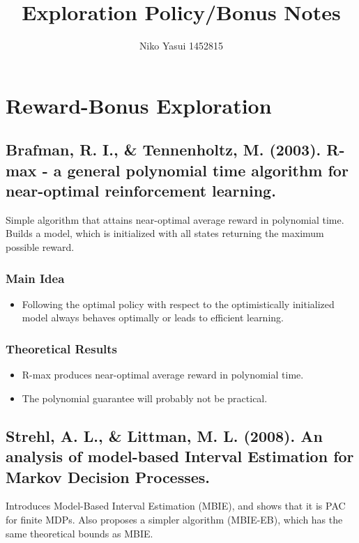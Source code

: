 \documentclass[12pt, oneside]{amsart}
\title{Exploration Policy/Bonus Notes}
\author{Niko Yasui 1452815}
\begin{document}
	
	\maketitle
	
	\section*{Reward-Bonus Exploration}
	
	\subsection*{Brafman, R. I., \& Tennenholtz, M. (2003). R-max - a general polynomial time algorithm for near-optimal reinforcement learning.}
	Simple algorithm that attains near-optimal average reward in polynomial time. Builds a model, which is initialized with all states returning the maximum possible reward. 
	\subsubsection*{Main Idea}
	\begin{itemize}
		\item Following the optimal policy with respect to the optimistically initialized model always behaves optimally or leads to efficient learning. 
	\end{itemize}
	
	\subsubsection*{Theoretical Results}
	\begin{itemize}
		\item R-max produces near-optimal average reward in polynomial time. 
		\item The polynomial guarantee will probably not be practical.
	\end{itemize}
	
	\subsection*{Strehl, A. L., \& Littman, M. L. (2008). An analysis of model-based Interval Estimation for Markov Decision Processes.}
	Introduces Model-Based Interval Estimation (MBIE), and shows that it is PAC for finite MDPs. Also proposes a simpler algorithm (MBIE-EB), which has the same theoretical bounds as MBIE. 
	
\end{document}
